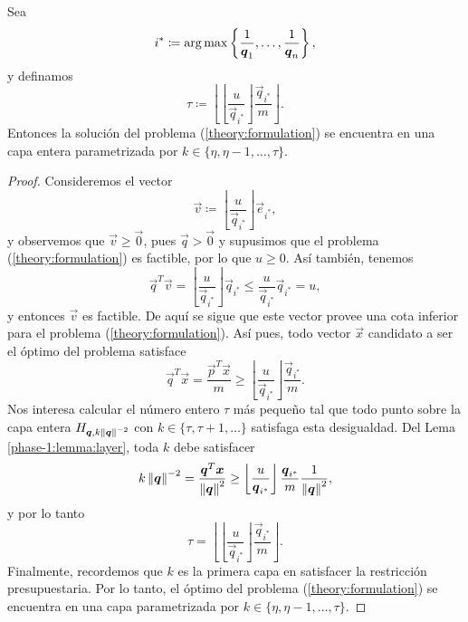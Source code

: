 \begin{lemma}
	Sea
	\begin{equation}
		\label{eq:last-index}
		i^* \coloneq \operatorname{arg\,max} \left\lbrace \frac{1}{\boldsymbol{q}_1}, \ldots, \frac{1}{\boldsymbol{q}_n} \right\rbrace,
	\end{equation}
	y definamos
	\begin{equation}
		\label{eq:tau}
		\tau \coloneq \left\lfloor \left\lfloor \frac{u}{\vec{q}_{i^*}} \right\rfloor
			\frac{\vec{q}_{i^*}}{m} \right\rfloor.
	\end{equation}
	Entonces la solución del problema (\ref{theory:formulation}) se encuentra en una capa entera
	parametrizada por $k \in \lbrace \eta, \eta - 1, \ldots, \tau \rbrace$.
\end{lemma}
\begin{proof}
	Consideremos el vector
	\begin{equation*}
		\vec{v} \coloneq \left\lfloor \frac{u}{\vec{q}_{i^*}} \right\rfloor \vec{e}_{i^*},
	\end{equation*}
	y observemos que $\vec{v} \geq \vec{0}$, pues $\vec{q} > \vec{0}$ y supusimos que el problema
	(\ref{theory:formulation}) es factible, por lo que $u \geq 0$. Así también, tenemos
	\begin{equation*}
		\vec{q}^T\vec{v} = \left\lfloor \frac{u}{\vec{q}_{i^*}} \right\rfloor \vec{q}_{i^*}
		\leq \frac{u}{\vec{q}_{i^*}}\vec{q}_{i^*} = u,
	\end{equation*}
	y entonces $\vec{v}$ es factible. De aquí se sigue que este vector provee una cota inferior para
	el problema (\ref{theory:formulation}). Así pues, todo vector $\vec{x}$ candidato a ser el
	óptimo del problema satisface
	\begin{equation*}
		\vec{q}^T\vec{x} = \frac{\vec{p}^T\vec{x}}{m} \geq \left\lfloor \frac{u}{\vec{q}_{i^*}}
		\right\rfloor \frac{\vec{q}_{i^*}}{m}.
	\end{equation*}
	Nos interesa calcular el número entero $\tau$ más pequeño tal que todo punto sobre la capa
	entera $H_{\boldsymbol{q}, k\left\lVert \boldsymbol{q} \right\rVert^{-2}}$ con $k \in \lbrace \tau, \tau + 1, \ldots \rbrace$
	satisfaga esta desigualdad. Del Lema \ref{phase-1:lemma:layer}, toda $k$ debe satisfacer
	\begin{equation*}
		k\left\lVert \boldsymbol{q} \right\rVert^{-2} = \frac{\boldsymbol{q}^T\boldsymbol{x}}{\left\lVert \boldsymbol{q} \right\rVert^2} \geq
		\left\lfloor \frac{u}{\boldsymbol{q}_{i^*}} \right\rfloor \frac{\boldsymbol{q}_{i^*}}{m}
		\frac{1}{\left\lVert \boldsymbol{q} \right\rVert^2},
	\end{equation*}
	y por lo tanto
	\begin{equation*}
		\tau =
		\left\lfloor \left\lfloor \frac{u}{\vec{q}_{i^*}} \right\rfloor \frac{\vec{q}_{i^*}}{m}
			\right\rfloor.
	\end{equation*}
	Finalmente, recordemos que $k$ es la primera capa en satisfacer la restricción presupuestaria.
	Por lo tanto, el óptimo del problema (\ref{theory:formulation}) se encuentra en una capa
	parametrizada por $k \in \lbrace \eta, \eta - 1, \ldots, \tau \rbrace$.
\end{proof}

